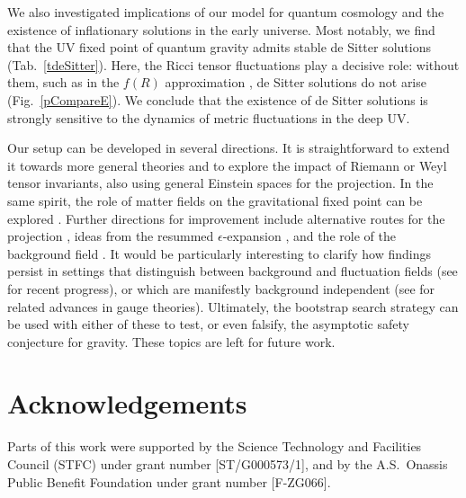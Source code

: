 \documentclass[notitlepage,eqsecnum,bm,amsmath,preprintnumbers,superscriptaddress,nofootinbib,aps,11pt]{revtex4-1}
\begin{document}
We also investigated implications of our model for quantum cosmology and the existence of inflationary solutions in the early universe. Most notably, we find that the UV fixed point of quantum gravity admits stable de Sitter solutions (Tab.~\ref{tdeSitter}). Here, the Ricci tensor fluctuations play a decisive role: without them, such as in the $f(R)$ approximation  \cite{Falls:2016wsa}, de Sitter solutions do not arise (Fig.~\ref{pCompareE}). We conclude that the existence of de Sitter solutions is strongly sensitive to the dynamics of metric fluctuations in the deep UV.


Our setup can be  developed in several directions. It is straightforward to extend it towards more general theories 
and to explore the impact of Riemann or Weyl tensor invariants, also using general Einstein spaces for the projection.
In the same spirit, the role of matter fields on the gravitational fixed point can  be explored \cite{Schroeder:Thesis,King:MSc,Christiansen:2017cxa}. 
Further directions for improvement include alternative routes for the projection \cite{Falls:2016msz}, ideas from the resummed $\epsilon$-expansion \cite{Falls:2017cze}, and the role of the background field 
\cite{Litim:1998nf,Freire:2000bq}. 
It would be particularly interesting to clarify how findings persist in settings that distinguish between background and fluctuation fields 
 (see \cite{Christiansen:2017bsy, Knorr:2017fus} for recent progress), 
or which are manifestly background independent (see \cite{Falls:2017nnu} for  related advances in gauge theories). Ultimately, the bootstrap search strategy can be used with either of these to test, or even falsify, the asymptotic safety conjecture for gravity.
These topics are left for future work.

\section*{\bf Acknowledgements}

Parts of this work were supported by the Science Technology and
Facilities Council (STFC) under grant number [ST/G000573/1], and by the A.S.~Onassis
Public Benefit Foundation under grant number [F-ZG066].



 










\appendix
{} 
\end{document}
